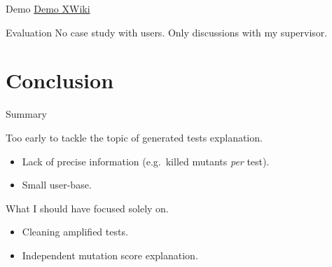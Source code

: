 \documentclass[aspectratio=169,dvipsnames]{beamer}
\begin{document}
\begin{frame}{Demo}
  \href{https://github.com/sbihel/xwiki-commons/issues/2\#issuecomment-394699634}{Demo XWiki}
\end{frame}

\begin{frame}{Evaluation}
  No case study with users. Only discussions with my supervisor.
\end{frame}


\section*{Conclusion}

\begin{frame}{Summary}
  \begin{block}{Too early to tackle the topic of generated tests explanation.}
    \begin{itemize}
      \item Lack of precise information (e.g.\ killed mutants \textit{per} test).
      \item Small user-base.
    \end{itemize}
  \end{block}

  \pause{}

  \begin{block}{What I should have focused solely on.}
    \begin{itemize}
      \item Cleaning amplified tests.
      \item Independent mutation score explanation.
    \end{itemize}
  \end{block}
\end{frame}

\appendix

\begin{frame}[standout]

\end{frame}
\end{document}
